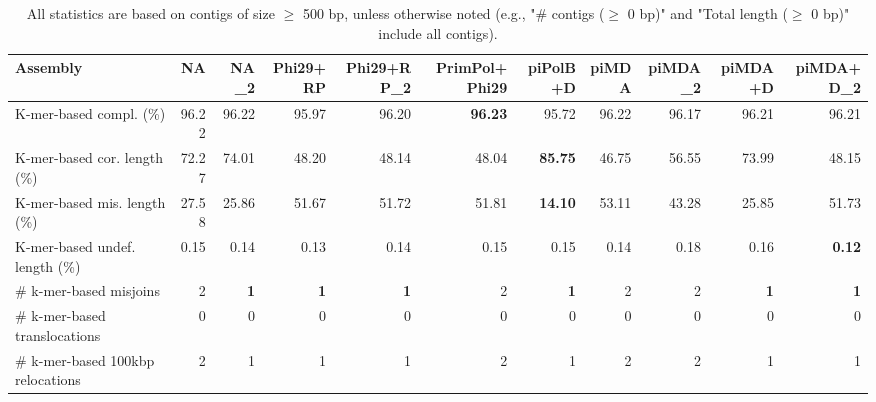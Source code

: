 \documentclass[12pt,a4paper]{article}
\begin{document}
\begin{table}[ht]
\begin{center}
\caption{All statistics are based on contigs of size $\geq$ 500 bp, unless otherwise noted (e.g., "\# contigs ($\geq$ 0 bp)" and "Total length ($\geq$ 0 bp)" include all contigs).}
\begin{tabular}{|l*{10}{|r}|}
\hline
Assembly & NA & NA\_2 & Phi29+RP & Phi29+RP\_2 & PrimPol+Phi29 & piPolB+D & piMDA & piMDA\_2 & piMDA+D & piMDA+D\_2 \\ \hline
K-mer-based compl. (\%) & 96.22 & 96.22 & 95.97 & 96.20 & {\bf 96.23} & 95.72 & 96.22 & 96.17 & 96.21 & 96.21 \\ \hline
K-mer-based cor. length (\%) & 72.27 & 74.01 & 48.20 & 48.14 & 48.04 & {\bf 85.75} & 46.75 & 56.55 & 73.99 & 48.15 \\ \hline
K-mer-based mis. length (\%) & 27.58 & 25.86 & 51.67 & 51.72 & 51.81 & {\bf 14.10} & 53.11 & 43.28 & 25.85 & 51.73 \\ \hline
K-mer-based undef. length (\%) & 0.15 & 0.14 & 0.13 & 0.14 & 0.15 & 0.15 & 0.14 & 0.18 & 0.16 & {\bf 0.12} \\ \hline
\# k-mer-based misjoins & 2 & {\bf 1} & {\bf 1} & {\bf 1} & 2 & {\bf 1} & 2 & 2 & {\bf 1} & {\bf 1} \\ \hline
\hspace{5mm}\# k-mer-based translocations & 0 & 0 & 0 & 0 & 0 & 0 & 0 & 0 & 0 & 0 \\ \hline
\hspace{5mm}\# k-mer-based 100kbp relocations & 2 & 1 & 1 & 1 & 2 & 1 & 2 & 2 & 1 & 1 \\ \hline
\end{tabular}
\end{center}
\end{table}
\end{document}
